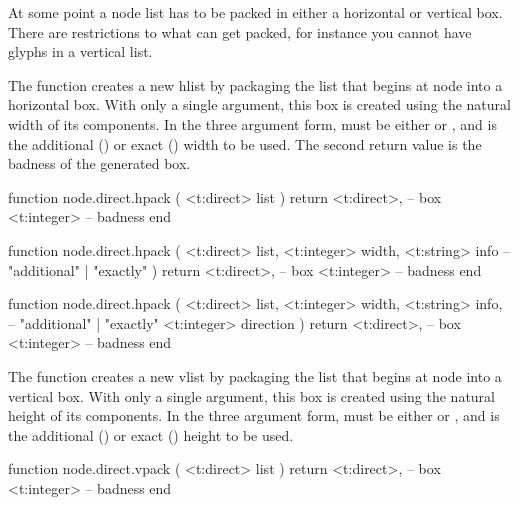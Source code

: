 \stopsubsection

\startsubsection[title=Packaging and dimensions]

At some point a node list has to be packed in either a horizontal or vertical
box. There are restrictions to what can get packed, for instance you cannot have
glyphs in a vertical list.


The  function creates a new hlist by packaging the list that begins
at node  into a horizontal box. With only a single argument, this box is
created using the natural width of its components. In the three argument form,
 must be either  or , and 
is the additional () or exact () width to be
used. The second return value is the badness of the generated box.

\starttyping[option=LUA]
function node.direct.hpack (
    <t:direct> list
)
    return
        <t:direct>, -- box
        <t:integer> -- badness
end

function node.direct.hpack (
    <t:direct>  list,
    <t:integer> width,
    <t:string>  info -- "additional" | "exactly"
)
    return
        <t:direct>, -- box
        <t:integer> -- badness
end

function node.direct.hpack (
    <t:direct>  list,
    <t:integer> width,
    <t:string>  info, -- "additional" | "exactly"
    <t:integer> direction
)
    return
        <t:direct>, -- box
        <t:integer> -- badness
end
\stoptyping


The  function creates a new vlist by packaging the list that begins
at node  into a vertical box. With only a single argument, this box is
created using the natural height of its components. In the three argument form,
 must be either  or , and 
is the additional () or exact () height to be
used.

\starttyping[option=LUA]
function node.direct.vpack (
    <t:direct> list
)
    return
        <t:direct>, -- box
        <t:integer> -- badness
end

